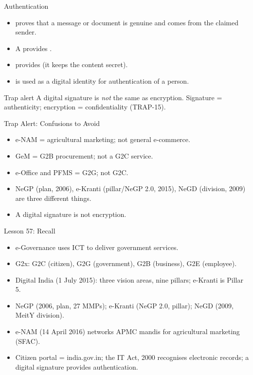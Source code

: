 \documentclass[aspectratio=169]{beamer}
\begin{document}
\begin{frame}{Authentication}
  \begin{itemize}
    \item {} proves that a message or document is genuine
      and comes from the claimed sender.
    \item A  provides .
    \item {} provides  (it keeps the
      content secret).
    \item {} is used as a digital identity for authentication of a
      person.
  \end{itemize}
  \begin{alertblock}{Trap alert}
    A digital signature is \emph{not} the same as encryption. Signature =
    authenticity; encryption = confidentiality (TRAP-15).
  \end{alertblock}
\end{frame}

\begin{frame}{Trap Alert: Confusions to Avoid}
  \begin{itemize}
    \item e-NAM = agricultural marketing; not general e-commerce.
    \item GeM = G2B procurement; not a G2C service.
    \item e-Office and PFMS = G2G; not G2C.
    \item NeGP (plan, 2006), e-Kranti (pillar/NeGP 2.0, 2015), NeGD
      (division, 2009) are three different things.
    \item A digital signature is not encryption.
  \end{itemize}
\end{frame}

\begin{frame}{Lesson 57: Recall}
  \begin{itemize}
    \item e-Governance uses ICT to deliver government services.
    \item G2x: G2C (citizen), G2G (government), G2B (business), G2E
      (employee).
    \item Digital India (1 July 2015): three vision areas, nine pillars;
      e-Kranti is Pillar 5.
    \item NeGP (2006, plan, 27 MMPs); e-Kranti (NeGP 2.0, pillar); NeGD
      (2009, MeitY division).
    \item e-NAM (14 April 2016) networks APMC mandis for agricultural
      marketing (SFAC).
    \item Citizen portal = india.gov.in; the IT Act, 2000 recognises
      electronic records; a digital signature provides authentication.
  \end{itemize}
\end{frame}
\end{document}
